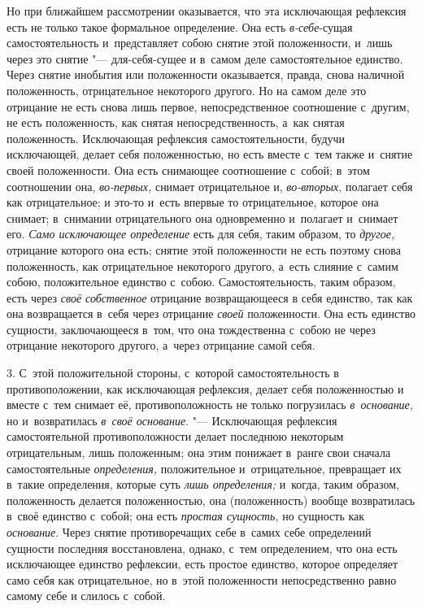 Но при ближайшем рассмотрении оказывается, что эта исключающая рефлексия
есть не только такое формальное определение. Она есть
{\em в-себе}{}-сущая самостоятельность и~представляет
собою снятие этой положенности, и~лишь через это снятие "--- для-себя-сущее и
в~самом деле самостоятельное единство. Через снятие инобытия или
положенности оказывается, правда, снова наличной положенность,
отрицательное некоторого другого. Но на самом деле это отрицание не есть
снова лишь первое, непосредственное соотношение с~другим, не есть
положенность, как снятая непосредственность, а~как снятая положенность.
Исключающая рефлексия самостоятельности, будучи исключающей, делает себя
положенностью, но есть вместе с~тем также и~снятие своей положенности. Она
есть снимающее соотношение с~собой; в~этом соотношении она,
{\em во-первых,} снимает отрицательное и,
{\em во-вторых,} полагает себя как отрицательное; и
это-то и~есть впервые то отрицательное, которое она снимает; в~снимании
отрицательного она одновременно и~полагает и~снимает его.
{\em Само исключающее определение} есть для себя, таким
образом, то {\em другое,} отрицание которого она есть;
снятие этой положенности не есть поэтому снова положенность, как
отрицательное некоторого другого, а~есть слияние с~самим собою,
положительное единство с~собою. Самостоятельность, таким образом, есть
через {\em своё собственное} отрицание возвращающееся в
себя единство, так как она возвращается в~себя через отрицание
{\em своей} положенности. Она есть единство сущности,
заключающееся в~том, что она тождественна с~собою не через отрицание
некоторого другого, а~через отрицание самой себя.

3. С~этой положительной стороны, с~которой самостоятельность в
противоположении, как исключающая рефлексия, делает себя положенностью и
вместе с~тем снимает её, противоположность не только погрузилась
{\em в~основание,} но и~возвратилась
{\em в~своё основание}. "--- Исключающая рефлексия
самостоятельной противоположности делает последнюю некоторым отрицательным,
лишь положенным; она этим понижает в~ранге свои сначала самостоятельные
{\em определения,} положительное и~отрицательное,
превращает их в~такие определения, которые суть
{\em лишь определения;} и~когда, таким образом,
положенность делается положенностью, она (положенность) вообще возвратилась
в~своё единство с~собой; она есть {\em простая
сущность,} но сущность как {\em основание}. Через
снятие противоречащих себе в~самих себе определений сущности последняя
восстановлена, однако, с~тем определением, что она есть исключающее
единство рефлексии, есть простое единство, которое определяет само себя как
отрицательное, но в~этой положенности непосредственно равно самому себе и
слилось с~собой.

